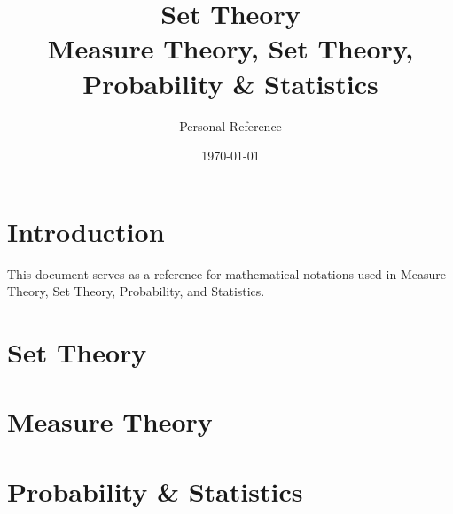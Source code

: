\documentclass[a4paper,10pt]{article}
\title{\textbf{Set Theory}\\\large Measure Theory, Set Theory, Probability \& Statistics}
\author{Personal Reference}
\date{\today}
\begin{document}
\maketitle
\tableofcontents
\newpage

\section{Introduction}
This document serves as a reference for mathematical notations used in Measure Theory, Set Theory, Probability, and Statistics.

\setlength{\tabcolsep}{10pt}
\renewcommand{\arraystretch}{1.5}

\section{Set Theory}


\section{Measure Theory}


\section{Probability \& Statistics}

\end{document}
